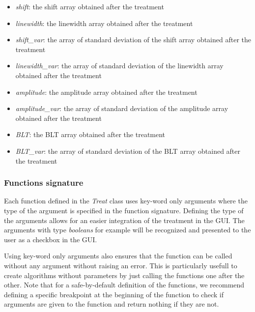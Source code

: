 \begin{itemize}
    \item \textit{shift}: the shift array obtained after the treatment
    \item \textit{linewidth}: the linewidth array obtained after the treatment
    \item \textit{shift\_var}: the array of standard deviation of the shift array obtained after the treatment
    \item \textit{linewidth\_var}: the array of standard deviation of the linewidth array obtained after the treatment
    \item \textit{amplitude}: the amplitude array obtained after the treatment
    \item \textit{amplitude\_var}: the array of standard deviation of the amplitude array obtained after the treatment
    \item \textit{BLT}: the BLT array obtained after the treatment
    \item \textit{BLT\_var}: the array of standard deviation of the BLT array obtained after the treatment
\end{itemize}

\subsubsection{Functions signature}

Each function defined in the \textit{Treat} class uses key-word only arguments where the type of the argument is specified in the function signature. Defining the type of the arguments allows for an easier integration of the treatment in the GUI. The arguments with type \textit{booleans} for example will be recognized and presented to the user as a checkbox in the GUI.

Using key-word only arguments also ensures that the function can be called without any argument without raising an error. This is particularly usefull to create algorithms without parameters by just calling the functions one after the other. Note that for a safe-by-default definition of the functions, we recommend defining a specific breakpoint at the beginning of the function to check if arguments are given to the function and return nothing if they are not.

